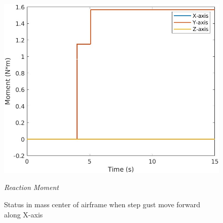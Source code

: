 \begin{figure}[htbp]
  \hfil
  \begin{minipage}[b]{0.3\textwidth}
    \centering
    \includegraphics[width=\textwidth]{Images/Gust/FIXED/3 moment_2.jpg}
    \caption*{\textit{Reaction Moment}}
  \end{minipage}
  \caption{Status in mass center of airframe when step gust move forward along X-axis}
  \label{fig:fixed x}
\end{figure}

